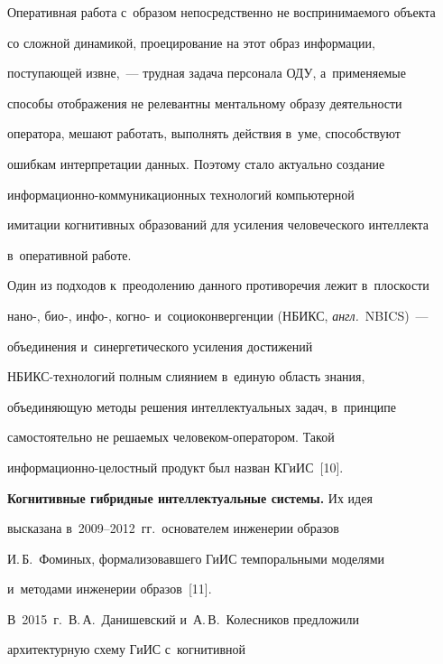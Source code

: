   


  Оперативная работа с~образом непосредственно не воспринимаемого объекта 


со сложной динамикой, проецирование на этот образ информации, 


поступающей извне,~--- трудная задача персонала ОДУ, а~применяемые 


способы отображения не релевантны ментальному образу деятельности 


оператора, мешают работать, выполнять действия в~уме, способствуют 


ошибкам интерпретации данных. Поэтому стало актуально создание  


ин\-фор\-ма\-ци\-он\-но-ком\-му\-ни\-ка\-ци\-он\-ных технологий компьютерной 


имитации когнитивных образований для усиления человеческого интеллекта 


в~оперативной работе. 


  


  Один из подходов к~преодолению данного противоречия лежит в~плоскости 


нано-, био-, инфо-, когно- и~социоконвергенции (НБИКС, \textit{англ.}\ NBICS)~--- 


объединения и~синергетического усиления достижений  


НБИКС-тех\-но\-ло\-гий полным слиянием в~единую область знания, 


объединяющую методы решения интеллектуальных задач, в~принципе 


самостоятельно не решаемых че\-ло\-ве\-ком-опе\-ра\-то\-ром. Такой  


ин\-фор\-ма\-ци\-он\-но-це\-лост\-ный продукт был назван КГиИС~[10].


  


  \textbf{Когнитивные гибридные интеллектуальные системы.} Их идея 


высказана в~2009--2012~гг.\ основателем инженерии образов 


И.\,Б.~Фоминых, формализовавшего ГиИС темпоральными моделями 


и~методами инженерии образов~[11].


  


  В~2015~г.\ В.\,А.~Данишевский  и~А.\,В.~Колесников предложили 


архитектурную схему ГиИС с~когнитивной 


